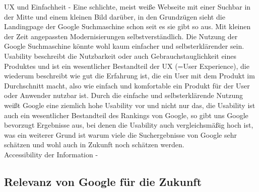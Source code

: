UX und Einfachheit - Eine schlichte, meist weiße Webseite mit einer Suchbar in der Mitte und einem kleinen Bild darüber, in den Grundzügen sieht die Landingpage der Google Suchmaschine schon seit es sie gibt so aus.
Mit kleinen der Zeit angepassten Modernisierungen selbstverständlich.
Die Nutzung der Google Suchmaschine könnte wohl kaum einfacher und selbsterklärender sein.
Usability beschreibt die Nutzbarkeit oder auch Gebrauchstauglichkeit eines Produktes und ist ein wesentlicher Bestandteil der UX (=User Experience), die wiederum beschreibt wie gut die Erfahrung ist, die ein User mit dem Produkt im Durchschnitt macht, also wie einfach und komfortable ein Produkt für der User oder Anwender nutzbar ist.\cite{Maulhardt.20220621}
Durch die einfache und selbsterklärende Nutzung weißt Google eine ziemlich hohe Usability vor und nicht nur das, die Usability ist auch ein wesentlicher Bestandteil des Rankings von Google, so gibt uns Google bevorzugt Ergebnisse aus, bei denen die Usability auch vergleichsmäßig hoch ist, was ein weiterer Grund ist warum viele die Suchergebnisse von Google sehr schätzen und wohl auch in Zukunft noch schätzen werden.\cite{LIC15}\\

Accessibility der Information -

\subsection{Relevanz von Google für die Zukunft}\label{subsec:relevanz-von-google-fur-die-zukunft}